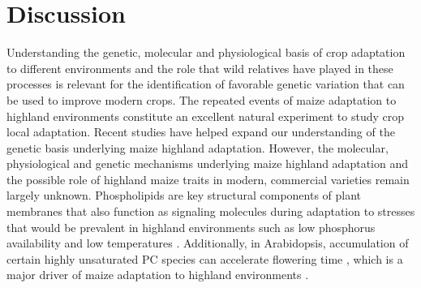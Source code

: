 \documentclass[9pt,twocolumn,twoside,lineno]{biorxiv}
\begin{document}
 \section{Discussion}
\label{sec:discussion}
Understanding the genetic, molecular and  physiological basis of crop adaptation to different environments and the role that wild relatives have played in these processes is relevant for the identification of favorable genetic variation that can be used to improve modern crops.
The repeated events of maize adaptation to highland environments constitute an excellent natural experiment to study crop local adaptation. 
Recent studies \cite{Wang2020-mp, Takuno2015-uj, Crow2020-gene} have helped expand our understanding of the genetic basis underlying maize highland adaptation. However, the molecular, physiological and genetic mechanisms underlying maize highland adaptation and the possible role of highland maize traits in modern, commercial varieties remain largely unknown.
Phospholipids are key structural components of plant membranes that also function as signaling molecules during adaptation to stresses that would be prevalent in highland environments \cite{Ryu2004-iv, Nakamura2017-vb} such as low phosphorus availability \cite{Veneklaas2012-ls, Cruz-Ramirez2004-ib, Lambers2012-an} and low temperatures \cite{Degenkolbe2012-wf, Welti2002-uk, Marla2017-ph}. 
Additionally, in Arabidopsis, accumulation of certain highly unsaturated PC species can accelerate flowering time \cite{Nakamura2014-qf}, which is a major driver of maize adaptation to highland environments \cite{Romero_Navarro2017-cn, Gates2019-xu, Mercer2019-vj}.
\end{document}
